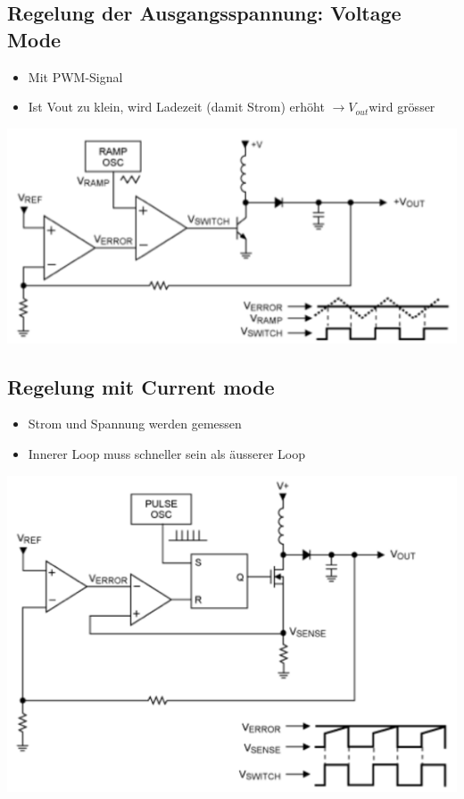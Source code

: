 \begin{multicols}{2}
\subsection{Regelung der Ausgangsspannung: Voltage Mode}
\begin{itemize}
  \item Mit PWM-Signal
  \item Ist Vout zu klein, wird Ladezeit (damit Strom) erhöht $\to V_{out}$wird
  grösser
\end{itemize}

\includegraphics[width=\linewidth]{pictures/ausgangsspannungsregelung}
\vfill\null
\columnbreak
\subsection{Regelung mit Current mode}
\begin{itemize}
	\item Strom und Spannung werden gemessen
	\item Innerer Loop muss schneller sein als äusserer Loop
\end{itemize}

\includegraphics[width=\linewidth]{pictures/currentmode}
\end{multicols}
